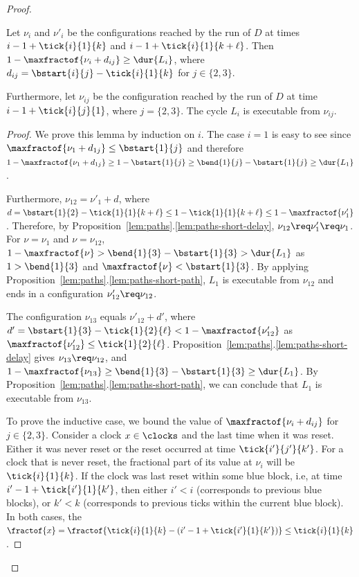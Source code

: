 \begin{proof}
\begin{lemma}
	\label{lem:safe}
Let $\nu_i$ and $\nu'_{i}$ be the configurations reached by the run of $D$ at times $i-1+\tick{i}{1}{k}$ and $i-1+\tick{i}{1}{k+\ell}$.
Then $1-\maxfractof{\nu_i+d_{ij}}\geq \dur{L_i} $, where $d_{ij}=\bstart{i}{j}- \tick{i}{1}{k}$ for $j\in \{2,3\}$.

Furthermore, let $\nu_{ij}$ be the configuration reached by the run of $D$ at time $i-1 + \tick{i}{j}{1}$, where $j=\{2,3\}$. The cycle $L_i$ is executable from $\nu_{ij}$.


\end{lemma}

\begin{proof}
	We prove this lemma by induction on $i$.
	The case $i=1$ is easy to see since
	$\maxfractof{\nu_1+d_{1j}} \leq \bstart{1}{j}$ and therefore $1-\maxfractof{\nu_1+d_{1j}}\geq 1-\bstart{1}{j}\geq \bend{1}{j}-\bstart{1}{j}\geq \dur{L_1}$.
	
    Furthermore, $\nu_{12}=\nu'_{1}+d$, where $d=\bstart{1}{2}-\tick{1}{1}{k+\ell}\leq 1-\tick{1}{1}{k+\ell}\leq 1- \maxfractof{\nu'_1}$. Therefore, by Proposition~\ref{lem:paths}.\ref{lem:paths-short-delay},  $\nu_{12}\req \nu'_1\req \nu_1$. 
	For $\nu= \nu_{1}$ and $\nu=\nu_{12}$, $1-\maxfractof{\nu}> \bend{1}{3}-\bstart{1}{3}>\dur{L_1}$
	as $1>\bend{1}{3}$ and $\maxfractof{\nu}<\bstart{1}{3}$.
	By applying Proposition~\ref{lem:paths}.\ref{lem:paths-short-path}, $L_1$ is executable from $\nu_{12}$ and ends in a configuration $\nu'_{12}\req \nu_{12}$. 
	
    The configuration $\nu_{13}$ equals $\nu'_{12}+d'$, where $d'= \bstart{1}{3}- \tick{1}{2}{\ell}< 1-\maxfractof{\nu'_{12}}$ as $\maxfractof{\nu'_{12}}\leq  \tick{1}{2}{\ell}$.
    Proposition~\ref{lem:paths}.\ref{lem:paths-short-delay} gives $\nu_{13}\req \nu_{12}$, and $1-\maxfractof{\nu_{13}}\geq \bend{1}{3}-\bstart{1}{3}\geq \dur{L_1}$. By Proposition~\ref{lem:paths}.\ref{lem:paths-short-path}, we can conclude that $L_1$ is executable from $\nu_{13}$.
	
	To prove the inductive case, we bound the value of $\maxfractof{\nu_i + d_{ij}}$ for $j\in\{2,3\}$. Consider a clock $x\in \clocks$ and the last time when it was reset. Either it was never reset or the reset occurred at time $\tick{i'}{j'}{k'}$. 
	For a clock that is never reset, the fractional part of its value at $\nu_i$ will be $\tick{i}{1}{k}$. 
	If the clock was last reset within some blue block, i.e, at time $i'-1+\tick{i'}{1}{k'}$,  then either $i'<i$ (corresponds to previous blue blocks), or $k'<k$ (corresponds to previous ticks within the current blue block).
	In both cases, the $\fractof{x}= \fractof{\tick{i}{1}{k}-(i'-1 +\tick{i'}{1}{k'})}\leq  \tick{i}{1}{k}$. 
	

\end{proof}
\end{proof}
